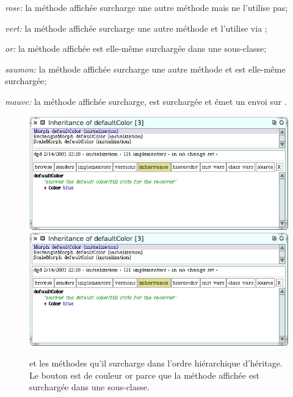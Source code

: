 \documentclass[a4paper,10pt,twoside]{book}
\begin{document}
\newcommand{\colourTag}[1]{\item[{\mdseries \itshape #1}]}

\begin{description}[noitemsep, leftmargin=*, labelindent=6em, labelwidth=4em, labelsep=*]
	\colourTag{rose:} la m\'ethode affich\'ee surcharge une autre m\'ethode mais ne l'utilise pas;
	\colourTag{vert:} la m\'ethode affich\'ee surcharge une autre m\'ethode et l'utilise via \super;
	\colourTag{or:} la m\'ethode affich\'ee est elle-m\^eme surcharg\'ee dans une sous-classe;
	\colourTag{saumon:} la m\'ethode affich\'ee surcharge une autre m\'ethode et est elle-m\^eme surcharg\'ee;
	\colourTag{mauve:} la m\'ethode affich\'ee surcharge, est surcharg\'ee et \'emet un envoi sur .
\end{description}

\begin{figure}[tbp]
	\begin{center}
   \ifluluelse
		{\includegraphics[width=\textwidth]{inheritanceOverriding}}
		{\includegraphics[scale=0.7]{inheritanceOverriding}}
	\end{center}
	\caption{ et les m\'ethodes qu'il surcharge dans l'ordre hi\'erarchique d'h\'eritage. 
	Le bouton  est de couleur or parce que la m\'ethode affich\'ee est surcharg\'ee dans une sous-classe.}
	\label{fig:inheritanceOverriding}
\end{figure}
\end{document}
